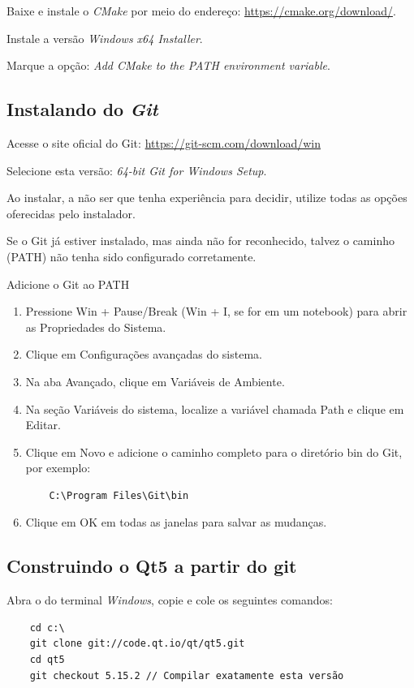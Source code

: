 \documentclass[a4paper,11pt]{article}
\newcommand{\cmake}{\textit{CMake}}
\newcommand{\windows}{\textit{Windows}}
\begin{document}
Baixe e instale o \cmake{} por meio do endereço: \url{https://cmake.org/download/}.

Instale a versão \textit{Windows x64 Installer}.

Marque a opção: \textit{Add CMake to the PATH environment variable}.

\subsection*{Instalando do \textit{Git}}

Acesse o site oficial do Git: \url{https://git-scm.com/download/win}

Selecione esta versão: \textit{64-bit Git for Windows Setup}.

Ao instalar, a não ser que tenha experiência para decidir, utilize todas as opções oferecidas pelo instalador.

Se o Git já estiver instalado, mas ainda não for reconhecido, talvez o caminho (PATH) não tenha sido configurado corretamente.

Adicione o Git ao PATH


\begin{enumerate}

	\item Pressione Win + Pause/Break (Win + I, se for em um notebook) para abrir as Propriedades do Sistema.
	\item Clique em Configurações avançadas do sistema.
	\item Na aba Avançado, clique em Variáveis de Ambiente.
	\item Na seção Variáveis do sistema, localize a variável chamada Path e clique em Editar.
	\item Clique em Novo e adicione o caminho completo para o diretório bin do Git, por exemplo:
	
	\begin{verbatim}
	C:\Program Files\Git\bin
	\end{verbatim}
	
	\item Clique em OK em todas as janelas para salvar as mudanças.

\end{enumerate}


\subsection*{Construindo o Qt5 a partir do git}

Abra o do terminal \windows{}, copie e cole os seguintes comandos:
\begin{mdframed}
\begin{verbatim}
	cd c:\
	git clone git://code.qt.io/qt/qt5.git
	cd qt5
	git checkout 5.15.2 // Compilar exatamente esta versão
\end{verbatim}
\end{mdframed}
\end{document}
